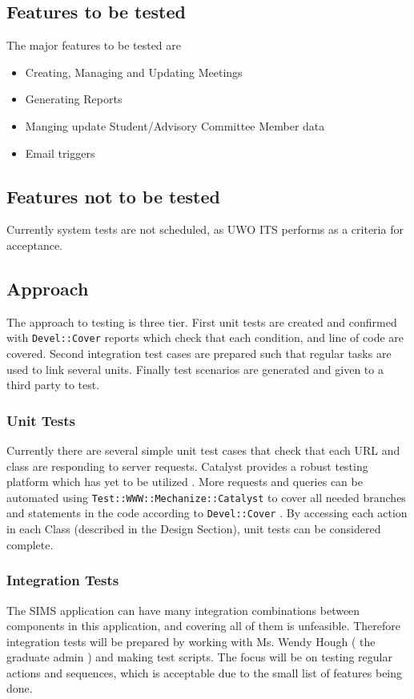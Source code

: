 \documentclass{journal}
\begin{document}
\subsection{Features to be tested}

The major features to be tested are 
\begin{itemize}
\item Creating, Managing and Updating Meetings 
\item Generating Reports 
\item Manging update Student/Advisory Committee Member data 
\item Email triggers 
\end{itemize}

\subsection{Features not to be tested}

Currently system tests are not scheduled, as UWO ITS performs as a criteria for acceptance. 

\subsection{Approach}
The approach to testing is three tier. First unit tests are created and confirmed with \verb+Devel::Cover+ reports which check that each condition, and line of code are covered. Second 
integration test cases are prepared such that regular tasks are used to link several units. Finally test scenarios are generated and given to a third party to test.

\subsubsection{Unit Tests}
Currently there are several simple unit test cases that check that each URL and class are responding to server requests. Catalyst provides a robust testing platform which has yet to be utilized \cite{CatTest}. 
More requests and queries can be automated using \verb+Test::WWW::Mechanize::Catalyst+ to cover all needed branches and statements in the code according to \verb+Devel::Cover+ . By accessing each action in each
Class (described in the Design Section), unit tests can be considered complete.  

\subsubsection{Integration Tests}
The SIMS application can have many integration combinations between components in this application, and covering all of them is unfeasible. Therefore integration tests will be prepared by working with Ms. Wendy Hough ( the graduate admin ) and making test scripts. 
The focus will be on testing regular actions and sequences, which is acceptable due to the small list of features being done. 
\end{document}
